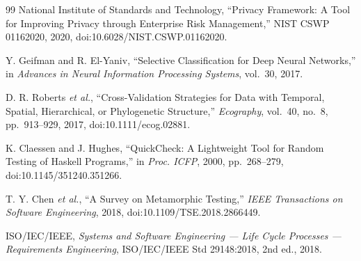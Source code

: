 \begin{thebibliography}{99}
National Institute of Standards and Technology, ``Privacy Framework: A Tool for Improving Privacy through Enterprise Risk Management,'' NIST CSWP 01162020, 2020, doi:10.6028/NIST.CSWP.01162020.

Y. Geifman and R. El-Yaniv, ``Selective Classification for Deep Neural Networks,'' in \emph{Advances in Neural Information Processing Systems}, vol.~30, 2017.

D. R. Roberts \emph{et al.}, ``Cross-Validation Strategies for Data with Temporal, Spatial, Hierarchical, or Phylogenetic Structure,'' \emph{Ecography}, vol.~40, no.~8, pp.~913--929, 2017, doi:10.1111/ecog.02881.

K. Claessen and J. Hughes, ``QuickCheck: A Lightweight Tool for Random Testing of Haskell Programs,'' in \emph{Proc. ICFP}, 2000, pp.~268--279, doi:10.1145/351240.351266.

T. Y. Chen \emph{et al.}, ``A Survey on Metamorphic Testing,'' \emph{IEEE Transactions on Software Engineering}, 2018, doi:10.1109/TSE.2018.2866449.

ISO/IEC/IEEE, \emph{Systems and Software Engineering --- Life Cycle Processes --- Requirements Engineering}, ISO/IEC/IEEE Std 29148:2018, 2nd ed., 2018.

\end{thebibliography}
